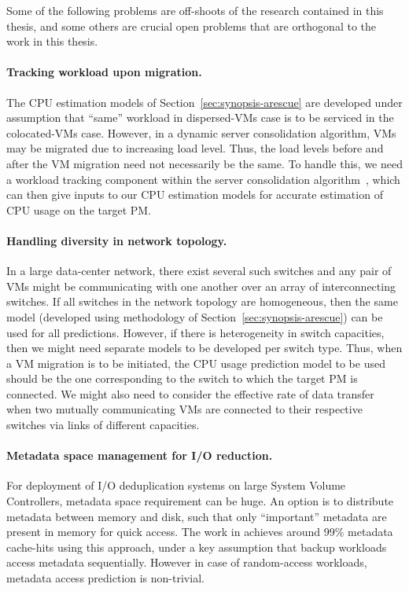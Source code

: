 Some of the following problems are off-shoots of the research
contained in this thesis, and some others are crucial open problems
that are orthogonal to the work in this thesis.

\paragraph{Tracking workload upon migration.}
The CPU estimation models of Section~\ref{sec:synopsis-arescue} are developed
under assumption that ``same'' workload in dispersed-VMs case 
is to be serviced
in the colocated-VMs case. However, in a dynamic server 
consolidation algorithm, VMs may be migrated due to increasing load level.
Thus, the load levels before and after the VM migration need not 
necessarily be the same. To handle this, we need a workload
tracking component within the server consolidation algorithm~\cite{sandpiper}, 
which can then give inputs to our CPU estimation models for
accurate estimation of CPU usage on the target PM.

\paragraph{Handling diversity in network topology.}
In a large data-center
network, there exist several such switches and any pair of VMs might
be communicating with one another over an array of interconnecting
switches.
If all switches in
the network topology are homogeneous, then the same model (developed
using methodology of Section~\ref{sec:synopsis-arescue}) can be
used for all predictions. However, if there is heterogeneity in
switch capacities, then we might need separate models to be
developed per switch type. Thus, when a VM migration is to be
initiated, the CPU usage prediction model to be used should be
the one corresponding to the switch to which the target PM is connected.
We might also need to consider the effective rate of data transfer
when two mutually communicating VMs are connected to their respective
switches via links of different capacities.

\paragraph{Metadata space management for I/O reduction.}
For deployment of I/O deduplication systems 
on large System Volume
Controllers, metadata space requirement can be huge.
An option is to distribute metadata between memory and disk, such that only
``important'' metadata are present in memory for quick
access. The work in \cite{data-domain} achieves around 99\%
metadata cache-hits using this approach, under a key assumption
that backup workloads access metadata sequentially.
However in case of random-access workloads,
metadata access prediction is non-trivial.

